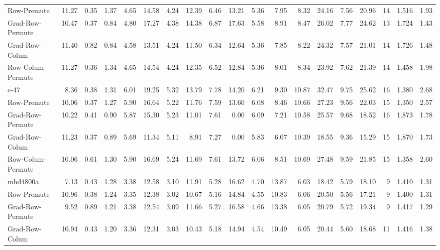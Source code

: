 \begin{table}[hbt]
\begin{tabular}{lrrrrrrrrrrrrrrrrrr}
Row-Premute          &11.27  &0.35 &  1.37 & 4.65 & 14.58 & 4.24 & 12.39  & 6.46  &13.21  & 5.36  & 7.95  &  8.32  &24.16  & 7.56  &20.96  &14  &1.516   &1.93  \\       
Grad-Row-Permute     &10.47  &0.37 &  0.84 & 4.80 & 17.27 & 4.38 & 14.38  & 6.87  &17.63  & 5.58  & 8.91  &  8.47  &26.02  & 7.77  &24.62  &13  &1.724   &1.43  \\       
Grad-Row-Colum       &11.40  &0.82 &  0.84 & 4.58 & 13.51 & 4.24 & 11.50  & 6.34  &12.64  & 5.36  & 7.85  &  8.22  &24.32  & 7.57  &21.01  &14  &1.726   &1.48  \\       
Row-Colum-Permute    &11.27  &0.36 &  1.34 & 4.65 & 14.54 & 4.24 & 12.35  & 6.52  &12.84  & 5.36  & 8.01  &  8.34  &23.92  & 7.62  &21.39  &14  &1.458   &1.98  \\ \hline
c-47                 & 8.36  &0.38 &  1.31 & 6.01 & 19.25 & 5.32 & 13.79  & 7.78  &14.20  & 6.21  & 9.30  & 10.87  &32.47  & 9.75  &25.62  &16  &1.380   &2.68  \\       
Row-Premute          &10.06  &0.37 &  1.27 & 5.90 & 16.64 & 5.22 & 11.76  & 7.59  &13.60  & 6.08  & 8.46  & 10.66  &27.23  & 9.56  &22.03  &15  &1.350   &2.57  \\       
Grad-Row-Permute     &10.22  &0.41 &  0.90 & 5.87 & 15.30 & 5.23 & 11.01  & 7.61  & 0.00  & 6.09  & 7.21  & 10.58  &25.57  & 9.68  &18.52  &16  &1.873   &1.78  \\       
Grad-Row-Colum       &11.23  &0.37 &  0.89 & 5.69 & 11.34 & 5.11 &  8.91  & 7.27  & 0.00  & 5.83  & 6.07  & 10.39  &18.55  & 9.36  &15.29  &15  &1.870   &1.73  \\       
Row-Colum-Permute    &10.06  &0.61 &  1.30 & 5.90 & 16.69 & 5.24 & 11.69  & 7.61  &13.72  & 6.06  & 8.51  & 10.69  &27.48  & 9.59  &21.85  &15  &1.358   &2.60  \\ \hline
mhd4800a             & 7.13  &0.43 &  1.28 & 3.38 & 12.58 & 3.10 & 11.91  & 5.28  &16.62  & 4.70  &13.87  &  6.03  &18.42  & 5.79  &18.10  & 9  &1.410   &1.31  \\       
Row-Premute          &10.96  &0.38 &  1.24 & 3.35 & 12.38 & 3.02 & 10.67  & 5.16  &14.84  & 4.55  &10.83  &  6.06  &20.50  & 5.56  &17.21  & 9  &1.400   &1.31  \\       
Grad-Row-Permute     & 9.52  &0.89 &  1.21 & 3.38 & 12.54 & 3.09 & 11.66  & 5.27  &16.58  & 4.66  &13.38  &  6.05  &20.79  & 5.72  &19.34  & 9  &1.417   &1.29  \\       
Grad-Row-Colum       &10.94  &0.43 &  1.20 & 3.36 & 12.31 & 3.03 & 10.43  & 5.18  &14.94  & 4.54  &10.49  &  6.05  &20.44  & 5.60  &18.68  &11  &1.416   &1.38  \\       

\end{tabular}
\end{table}
